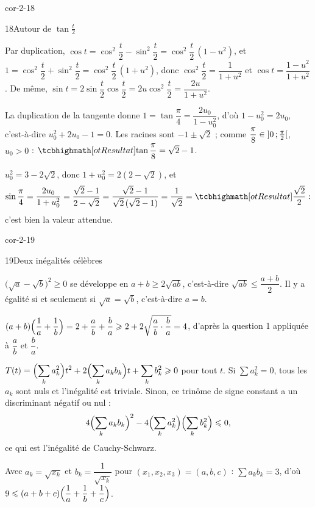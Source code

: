 \begin{blocLivre}{cor-2-18}
\begin{corrige}{18}{Autour de $\tan\frac{t}{2}$}
\begin{questions}
  \item Par duplication, $\cos t=\cos^{2}\dfrac{t}{2}-\sin^{2}\dfrac{t}{2}
    =\cos^{2}\dfrac{t}{2}\,(1-u^{2})$, et
    $1=\cos^{2}\dfrac{t}{2}+\sin^{2}\dfrac{t}{2}=\cos^{2}\dfrac{t}{2}\,(1+u^{2})$,
    donc $\cos^{2}\dfrac{t}{2}=\dfrac{1}{1+u^{2}}$ et
    $\cos t=\dfrac{1-u^{2}}{1+u^{2}}$. De même,
    $\sin t=2\sin\dfrac{t}{2}\cos\dfrac{t}{2}=2u\cos^{2}\dfrac{t}{2}
    =\dfrac{2u}{1+u^{2}}$.
  \item La duplication de la tangente donne
    $1=\tan\dfrac{\pi}{4}=\dfrac{2u_0}{1-u_0^{2}}$, d'où
    $1-u_0^{2}=2u_0$, c'est-à-dire $u_0^{2}+2u_0-1=0$. Les racines sont
    $-1\pm\sqrt2$ ; comme $\dfrac{\pi}{8}\in\intOO{0}{\frac{\pi}{2}}$,
    $u_0>0$ : $\res{\tan\dfrac{\pi}{8}=\sqrt2-1}$.
  \item $u_0^{2}=3-2\sqrt2$, donc $1+u_0^{2}=2(2-\sqrt2)$, et
    \[
      \sin\frac{\pi}{4}=\frac{2u_0}{1+u_0^{2}}=\frac{\sqrt2-1}{2-\sqrt2}
      =\frac{\sqrt2-1}{\sqrt2\,(\sqrt2-1)}=\frac{1}{\sqrt2}=\res{\frac{\sqrt2}{2}} :
    \]
    c'est bien la valeur attendue.
\end{questions}
\end{corrige}
\end{blocLivre}

\begin{blocLivre}{cor-2-19}
\begin{corrige}{19}{Deux inégalités célèbres}
\begin{questions}
  \item $\bigl(\sqrt a-\sqrt b\bigr)^{2}\geq0$ se développe en
    $a+b\geq2\sqrt{ab}$, c'est-à-dire $\sqrt{ab}\leq\dfrac{a+b}{2}$. Il y a
    égalité si et seulement si $\sqrt a=\sqrt b$, c'est-à-dire $a=b$.
  \item $(a+b)\Bigl(\dfrac1a+\dfrac1b\Bigr)=2+\dfrac{a}{b}+\dfrac{b}{a}
    \geq2+2\sqrt{\dfrac{a}{b}\cdot\dfrac{b}{a}}=4$, d'après la question 1
    appliquée à $\dfrac ab$ et $\dfrac ba$.
  \item $T(t)=\Bigl(\displaystyle\sum_k a_k^{2}\Bigr)t^{2}
    +2\Bigl(\displaystyle\sum_k a_k b_k\Bigr)t+\displaystyle\sum_k b_k^{2}\geq0$ pour tout $t$.
    Si $\sum a_k^{2}=0$, tous les $a_k$ sont nuls et l'inégalité est triviale.
    Sinon, ce trinôme de signe constant a un discriminant négatif ou nul :
    \[
      4\Bigl(\sum_k a_k b_k\Bigr)^{2}-4\Bigl(\sum_k a_k^{2}\Bigr)\Bigl(\sum_k b_k^{2}\Bigr)\leq0,
    \]
    ce qui est l'inégalité de Cauchy-Schwarz.
  \item Avec $a_k=\sqrt{x_k}$ et $b_k=\dfrac{1}{\sqrt{x_k}}$ pour
    $(x_1,x_2,x_3)=(a,b,c)$ : $\sum a_kb_k=3$, d'où
    $9\leq(a+b+c)\Bigl(\dfrac1a+\dfrac1b+\dfrac1c\Bigr)$.
\end{questions}
\end{corrige}
\end{blocLivre}

